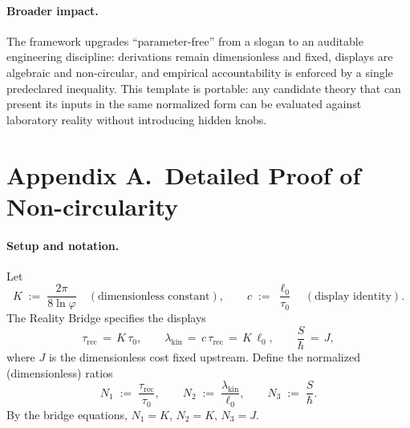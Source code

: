 \documentclass[11pt]{article}
\theoremstyle{plain}
\theoremstyle{definition}
\theoremstyle{remark}
\begin{document}
\paragraph{Broader impact.}
The framework upgrades “parameter-free” from a slogan to an auditable engineering discipline: derivations remain dimensionless and fixed, displays are algebraic and non-circular, and empirical accountability is enforced by a single pre\-declared inequality. This template is portable: any candidate theory that can present its inputs in the same normalized form can be evaluated against laboratory reality without introducing hidden knobs.

\appendix

\section*{Appendix A.\ Detailed Proof of Non-circularity}

\paragraph{Setup and notation.}
Let
\[
K\;:=\;\frac{2\pi}{8\ln\varphi}\quad(\text{dimensionless constant}),\qquad
c\;:=\;\frac{\ell_{0}}{\tau_{0}}\quad(\text{display identity}).
\]
The Reality Bridge specifies the displays
\[
\tau_{\mathrm{rec}}\,=\,K\,\tau_{0},\qquad
\lambda_{\mathrm{kin}}\,=\,c\,\tau_{\mathrm{rec}}\,=\,K\,\ell_{0},\qquad
\frac{S}{\hbar}\,=\,J,
\]
where \(J\) is the dimensionless cost fixed upstream. Define the normalized (dimensionless) ratios
\[
N_{1}\;:=\;\frac{\tau_{\mathrm{rec}}}{\tau_{0}},\qquad
N_{2}\;:=\;\frac{\lambda_{\mathrm{kin}}}{\ell_{0}},\qquad
N_{3}\;:=\;\frac{S}{\hbar}.
\]
By the bridge equations, \(N_{1}=K\), \(N_{2}=K\), \(N_{3}=J\).
\end{document}
